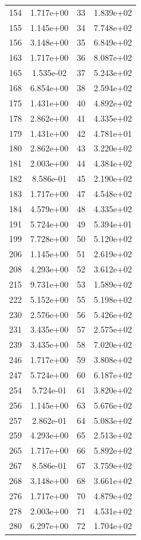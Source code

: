 \documentclass[12pt]{article}
\begin{document}
\begin{longtable}{@{}cccc@{}}
154 & 1.717e+00 & 33 & 1.839e+02 \\
155 & 1.145e+00 & 34 & 7.748e+02 \\
156 & 3.148e+00 & 35 & 6.849e+02 \\
163 & 1.717e+00 & 36 & 8.087e+02 \\
165 & 1.535e-02 & 37 & 5.243e+02 \\
168 & 6.854e+00 & 38 & 2.594e+02 \\
175 & 1.431e+00 & 40 & 4.892e+02 \\
178 & 2.862e+00 & 41 & 4.335e+02 \\
179 & 1.431e+00 & 42 & 4.781e+01 \\
180 & 2.862e+00 & 43 & 3.220e+02 \\
181 & 2.003e+00 & 44 & 4.384e+02 \\
182 & 8.586e-01 & 45 & 2.190e+02 \\
183 & 1.717e+00 & 47 & 4.548e+02 \\
184 & 4.579e+00 & 48 & 4.335e+02 \\
191 & 5.724e+00 & 49 & 5.394e+01 \\
199 & 7.728e+00 & 50 & 5.120e+02 \\
206 & 1.145e+00 & 51 & 2.619e+02 \\
208 & 4.293e+00 & 52 & 3.612e+02 \\
215 & 9.731e+00 & 53 & 1.589e+02 \\
222 & 5.152e+00 & 55 & 5.198e+02 \\
230 & 2.576e+00 & 56 & 5.426e+02 \\
231 & 3.435e+00 & 57 & 2.575e+02 \\
239 & 3.435e+00 & 58 & 7.020e+02 \\
246 & 1.717e+00 & 59 & 3.808e+02 \\
247 & 5.724e+00 & 60 & 6.187e+02 \\
254 & 5.724e-01 & 61 & 3.820e+02 \\
256 & 1.145e+00 & 63 & 5.676e+02 \\
257 & 2.862e-01 & 64 & 5.083e+02 \\
259 & 4.293e+00 & 65 & 2.513e+02 \\
265 & 1.717e+00 & 66 & 5.892e+02 \\
267 & 8.586e-01 & 67 & 3.759e+02 \\
268 & 3.148e+00 & 68 & 3.661e+02 \\
276 & 1.717e+00 & 70 & 4.879e+02 \\
278 & 2.003e+00 & 71 & 4.531e+02 \\
280 & 6.297e+00 & 72 & 1.704e+02 \\

\end{longtable}
\end{document}
